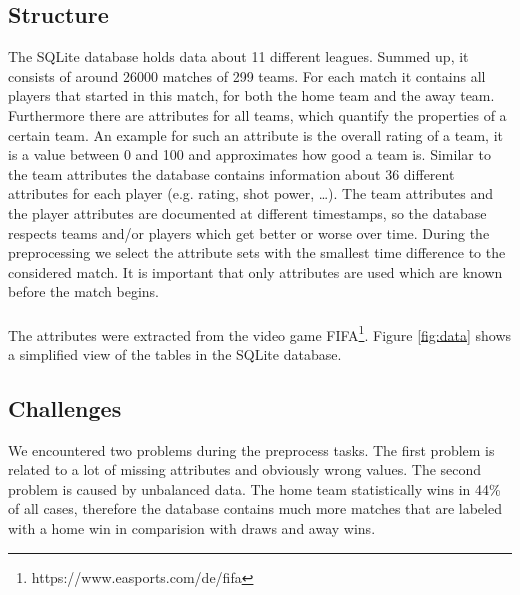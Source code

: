 \documentclass[a4paper]{article}
\begin{document}
\subsection{Structure}
The SQLite database holds data about 11 different leagues. Summed up, it
consists of around 26000 matches of 299 teams. For each match it contains all
players that started in this match, for both the home team and the away team.
Furthermore there are attributes for all teams, which quantify the properties of
a certain team. An example for such an attribute is the overall rating of a
team, it is a value between 0 and 100 and approximates how good a team is.
Similar to the team attributes the database contains information about 36
different attributes for each player (e.g.
rating, shot power, \ldots). The team attributes and the player attributes are
documented at different timestamps, so the database respects teams and/or
players which get better or worse over time. During the preprocessing we select
the attribute sets with the smallest time difference to the considered match. It
is important that only attributes are used which are known before the match
begins.
\\\\
The attributes were extracted from the video game
FIFA\footnote{https://www.easports.com/de/fifa}.
Figure \ref{fig:data} shows a simplified view of the tables in the SQLite
database.

\subsection{Challenges}
We encountered two problems during the preprocess tasks. The first problem is
related to a lot of missing attributes and obviously wrong values. The second
problem is caused by unbalanced data. The home team statistically wins in 44\%
of all cases, therefore the database contains much more matches that are labeled
with a home win in comparision with draws and away wins.
\end{document}

